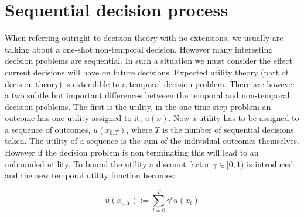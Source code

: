 \section{Sequential decision process}\label{sec:sqp}

When referring outright to decision theory with no extensions, we usually are talking about a one-shot
non-temporal decision. However many interesting decision problems are sequential.
In such a situation we must consider the effect current decisions will have on future decisions. Expected utility 
theory (part of decision theory) is extendible to a temporal decision problem. There are however a two subtle but important 
differences between the temporal and non-temporal decision problems. The first is the utility, in the one time step problem 
an outcome has one utility assigned to it, $u(x)$. Now a utility has to be assigned to a sequence of outcomes, $u(x_{0:T})$, 
where $T$ is the number of sequential decisions taken. The utility of a sequence is the sum of the individual outcomes 
themselves. However if the decision problem is non terminating this will lead to an unbounded utility. To bound the utility a 
discount factor $\gamma \in [0,1)$ is introduced and the new temporal utility function becomes:

\begin{equation}
    u(x_{0:T}) 	   := \sum\limits_{t=0}^{T} \gamma^{t} u(x_t) \label{eq:joint_state_actions_util}
\end{equation}

